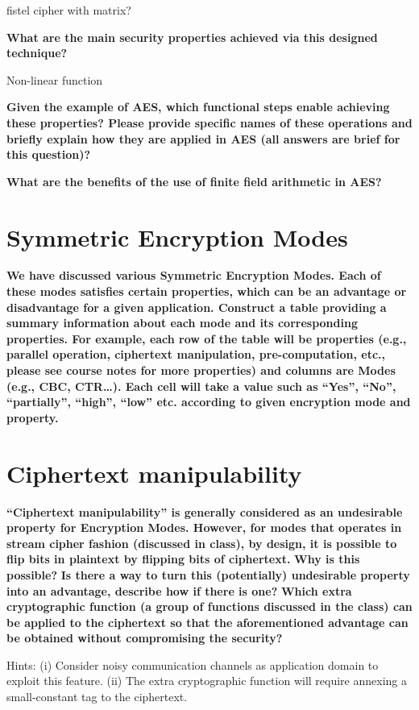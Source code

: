 \documentclass[letterpaper,11pt,notitlepage,fleqn]{article}
\begin{document}
fistel cipher with matrix?

\noindent \textbf{What are the main security properties achieved via this designed technique?}

Non-linear function

\noindent \textbf{Given the  example  of  AES,  which  functional  steps  enable achieving  these  properties?  Please provide  specific  names  of  these operations  and  briefly  explain  how  they  are  applied  in AES (all answers are brief for this question)?}

\noindent \textbf{What are the benefits of the use of finite field arithmetic in AES?}


\section{Symmetric Encryption Modes}
\noindent \textbf{We have discussed various Symmetric Encryption Modes. Each of  these modes  satisfies certain properties, which can be  an  advantage or disadvantage  for  a given  application. Construct a  table providing a  summary  information  about  each mode and  its corresponding properties. For example,  each  row  of  the  table  will  be  properties  (e.g.,  parallel  operation,  ciphertext manipulation,  pre-computation,  etc.,  please  see  course  notes  for  more  properties)  and  columns are  Modes  (e.g.,  CBC,  CTR…).  Each  cell  will  take  a  value  such  as  “Yes”,  “No”,  “partially”, “high”, “low” etc. according to given encryption mode and property.}

\section{Ciphertext  manipulability}
\noindent \textbf{“Ciphertext  manipulability”  is  generally  considered  as  an  undesirable  property  for Encryption  Modes.  However,  for  modes  that  operates  in  stream  cipher  fashion  (discussed  in class), by design, it is possible to flip bits in plaintext by flipping bits of ciphertext.}
\noindent \textbf{Why is this possible?}
\noindent \textbf{Is  there  a  way  to  turn  this  (potentially)  undesirable  property  into  an  advantage, describe how if there is one?}
\noindent \textbf{Which  extra  cryptographic  function  (a  group  of  functions  discussed  in  the  class)  can be applied to the ciphertext so that the aforementioned advantage can be obtained without compromising the security?}

\noindent Hints:  (i) Consider  noisy  communication  channels  as  application  domain  to  exploit  this  feature. 
(ii) The extra cryptographic function will require annexing a small-constant tag to the ciphertext. 
\end{document}
